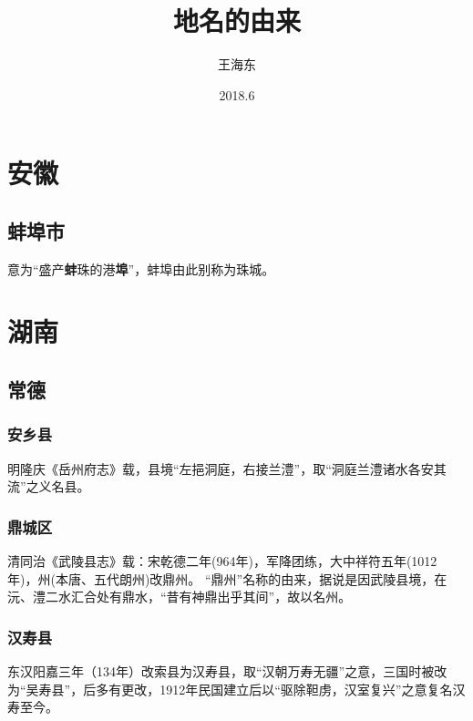 \documentclass[12pt]{book}
\title{地名的由来}%
\author{王海东}
\date{2018.6}
\begin{document}
  
\begin{CJK*}{UTF8}{gbsn}%
\maketitle  
\thispagestyle{empty} %
\clearpage
  
\setcounter{page}{1}  
  
  
\clearpage  
\tableofcontents  
\newpage  

\setcounter{page}{1}

\chapter{安徽}
\section{蚌埠市}
意为“盛产\textbf{蚌}珠的港\textbf{埠}”，蚌埠由此别称为珠城。

\chapter{湖南}

\section{常德}
\subsection{安乡县}
明隆庆《岳州府志》载，县境“左挹洞庭，右接兰澧”，取“洞庭兰澧诸水各安其流”之义名县。

\subsection{鼎城区}
清同治《武陵县志》载：宋乾德二年(964年)，军降团练，大中祥符五年(1012年)，州(本唐、五代朗州)改鼎州。
“鼎州”名称的由来，据说是因武陵县境，在沅、澧二水汇合处有鼎水，“昔有神鼎出乎其间”，故以名州。

\subsection{汉寿县}
东汉阳嘉三年（134年）改索县为汉寿县，取“汉朝万寿无疆”之意，三国时被改为“吴寿县”，后多有更改，1912年民国建立后以“驱除靼虏，汉室复兴”之意复名汉寿至今。


\clearpage  %
\end{CJK*}%
\end{document}
